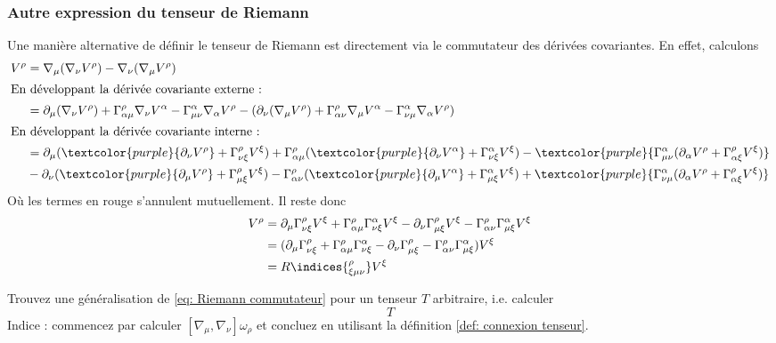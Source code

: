 \subsubsection{Autre expression du tenseur de Riemann}
Une manière alternative de définir le tenseur de Riemann est directement via le commutateur des dérivées covariantes. En effet, calculons
\begin{align*}
    [\nabla_{\mu}, \nabla_{\nu}]V^{\rho} &= \nabla_{\mu}(\nabla_{\nu}V^{\rho}) - \nabla_{\nu}(\nabla_{\mu}V^{\rho})\\
    \intertext{En développant la dérivée covariante externe :}
    &= \partial_{\mu}(\nabla_{\nu}V^{\rho}) + \Gamma^{\rho}_{\alpha \mu}\nabla_{\nu}V^{\alpha}-\Gamma^{\alpha}_{\mu \nu}\nabla_{\alpha}V^{\rho} -(\partial_{\nu}(\nabla_{\mu}V^{\rho}) + \Gamma^{\rho}_{\alpha \nu}\nabla_{\mu}V^{\alpha}-\Gamma^{\alpha}_{\nu \mu}\nabla_{\alpha}V^{\rho})\\
    \intertext{En développant la dérivée covariante interne :}
    &= \partial_{\mu}(\textcolor{purple}{\partial_{\nu}V^{\rho}} + \Gamma^{\rho}_{\nu \xi}V^{\xi}) + \Gamma^{\rho}_{\alpha \mu}(\textcolor{purple}{\partial_{\nu}V^{\alpha}}+\Gamma^{\alpha}_{\nu \xi}V^{\xi}) - \textcolor{purple}{\Gamma^{\alpha}_{\mu \nu}(\partial_{\alpha}V^{\rho} + \Gamma^{\rho}_{\alpha \xi}V^{\xi})} \\
    &-\partial_{\nu}(\textcolor{purple}{\partial_{\mu}V^{\rho}} + \Gamma^{\rho}_{\mu \xi}V^{\xi}) - \Gamma^{\rho}_{\alpha \nu}(\textcolor{purple}{\partial_{\mu}V^{\alpha}}+\Gamma^{\alpha}_{\mu \xi}V^{\xi}) +\textcolor{purple}{\Gamma^{\alpha}_{\nu \mu}(\partial_{\alpha}V^{\rho} + \Gamma^{\rho}_{\alpha \xi}V^{\xi})}
\end{align*}
Où les termes en rouge s'annulent mutuellement. Il reste donc
\begin{align}
    [\nabla_{\mu}, \nabla_{\nu}]V^{\rho} &= \partial_{\mu}\Gamma^{\rho}_{\nu \xi}V^{\xi} + \Gamma^{\rho}_{\alpha \mu}\Gamma^{\alpha}_{\nu \xi}V^{\xi} -\partial_{\nu}\Gamma^{\rho}_{\mu \xi}V^{\xi} -\Gamma^{\rho}_{\alpha \nu}\Gamma^{\alpha}_{\mu \xi}V^{\xi}\\
    &= (\partial_{\mu}\Gamma^{\rho}_{\nu \xi} + \Gamma^{\rho}_{\alpha \mu}\Gamma^{\alpha}_{\nu \xi} - \partial_{\nu}\Gamma^{\rho}_{\mu \xi} - \Gamma^{\rho}_{\alpha \nu}\Gamma^{\alpha}_{\mu \xi})V^{\xi}\\
    \label{eq: Riemann commutateur}
    &= R\indices{^{\rho}_{\xi \mu \nu}}V^{\xi}
\end{align}
\begin{exerc}
    Trouvez une généralisation de \ref{eq: Riemann commutateur} pour un tenseur $T$ arbitraire, i.e. calculer
    \begin{equation}
        [\nabla_\mu,\nabla_\nu] T
    \end{equation}
    Indice : commencez par calculer $[\nabla_\mu,\nabla_\nu] \omega_\rho$ et concluez en utilisant la définition \ref{def: connexion tenseur}.
\end{exerc}
